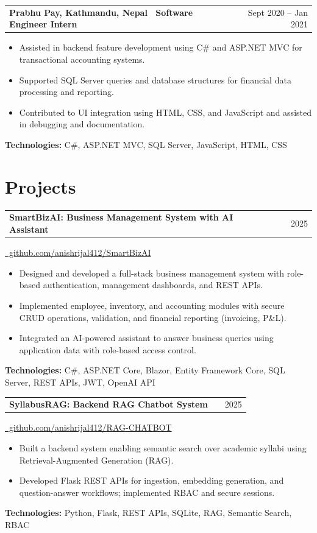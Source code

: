 \documentclass[a4paper,10pt]{article}
\makeatletter
\newenvironment{joblong}[2]
{
    \vspace{1pt}
    \begin{tabularx}{\linewidth}{@{}l X r@{}}
    \textbf{\normalsize #1} & \hfill & {\normalsize #2} \\[-1pt]
    \end{tabularx}
    \vspace{-2pt}
    \begin{minipage}[t]{\linewidth}
    \small
}
{
    \end{minipage}\vspace{1pt}
}
\makeatother
\begin{document}
\begin{joblong}{Prabhu Pay, Kathmandu, Nepal \textbullet\ Software Engineer Intern}{Sept 2020 -- Jan 2021}
\begin{itemize}[label=\textbullet]
\item Assisted in backend feature development using C\# and ASP.NET MVC for transactional accounting systems.
\item Supported SQL Server queries and database structures for financial data processing and reporting.
\item Contributed to UI integration using HTML, CSS, and JavaScript and assisted in debugging and documentation.
\end{itemize}
\textbf{Technologies:} C\#, ASP.NET MVC, SQL Server, JavaScript, HTML, CSS
\end{joblong}

\section{Projects}

\begin{joblong}{SmartBizAI: Business Management System with AI Assistant}{2025}
\href{https://github.com/anishrijal412/SmartBizAI}{\faGithub\ github.com/anishrijal412/SmartBizAI}
\vspace{-2pt}
\begin{itemize}[label=\textbullet]
\item Designed and developed a full-stack business management system with role-based authentication, management dashboards, and REST APIs.
\item Implemented employee, inventory, and accounting modules with secure CRUD operations, validation, and financial reporting (invoicing, P\&L).
\item Integrated an AI-powered assistant to answer business queries using application data with role-based access control.
\end{itemize}
\textbf{Technologies:} C\#, ASP.NET Core, Blazor, Entity Framework Core, SQL Server, REST APIs, JWT, OpenAI API
\end{joblong}

\begin{joblong}{SyllabusRAG: Backend RAG Chatbot System}{2025}
\href{https://github.com/anishrijal412/RAG-CHATBOT}{\faGithub\ github.com/anishrijal412/RAG-CHATBOT}
\vspace{-2pt}
\begin{itemize}[label=\textbullet]
\item Built a backend system enabling semantic search over academic syllabi using Retrieval-Augmented Generation (RAG).
\item Developed Flask REST APIs for ingestion, embedding generation, and question-answer workflows; implemented RBAC and secure sessions.
\end{itemize}
\textbf{Technologies:} Python, Flask, REST APIs, SQLite, RAG, Semantic Search, RBAC
\end{joblong}
\end{document}
